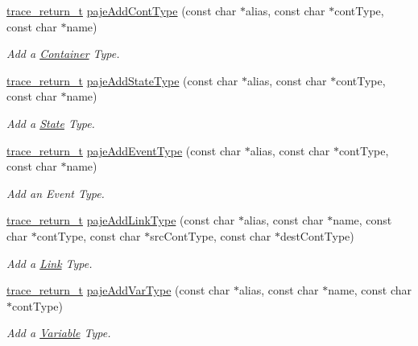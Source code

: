\begin{DoxyCompactItemize}
\hyperlink{group__type_ga1f1b68fb37d7331f03a48ef0993a0788}{trace\-\_\-return\-\_\-t} \hyperlink{group__cpaje_ga49ae68f2a567d8bbac4cb6f7b6726ae8}{paje\-Add\-Cont\-Type} (const char $\ast$alias, const char $\ast$cont\-Type, const char $\ast$name)
\begin{DoxyCompactList}\small\item\em Add a \hyperlink{structContainer}{Container} Type. \end{DoxyCompactList}\item 
\hyperlink{group__type_ga1f1b68fb37d7331f03a48ef0993a0788}{trace\-\_\-return\-\_\-t} \hyperlink{group__cpaje_gab77a5b730b5b0e58777d75e1c1bfbdaf}{paje\-Add\-State\-Type} (const char $\ast$alias, const char $\ast$cont\-Type, const char $\ast$name)
\begin{DoxyCompactList}\small\item\em Add a \hyperlink{structState}{State} Type. \end{DoxyCompactList}\item 
\hyperlink{group__type_ga1f1b68fb37d7331f03a48ef0993a0788}{trace\-\_\-return\-\_\-t} \hyperlink{group__cpaje_gaebcc766a17f5ffc055432687e946a1ea}{paje\-Add\-Event\-Type} (const char $\ast$alias, const char $\ast$cont\-Type, const char $\ast$name)
\begin{DoxyCompactList}\small\item\em Add an Event Type. \end{DoxyCompactList}\item 
\hyperlink{group__type_ga1f1b68fb37d7331f03a48ef0993a0788}{trace\-\_\-return\-\_\-t} \hyperlink{group__cpaje_ga4b8a30594207e3bd62ad22500a363555}{paje\-Add\-Link\-Type} (const char $\ast$alias, const char $\ast$name, const char $\ast$cont\-Type, const char $\ast$src\-Cont\-Type, const char $\ast$dest\-Cont\-Type)
\begin{DoxyCompactList}\small\item\em Add a \hyperlink{structLink}{Link} Type. \end{DoxyCompactList}\item 
\hyperlink{group__type_ga1f1b68fb37d7331f03a48ef0993a0788}{trace\-\_\-return\-\_\-t} \hyperlink{group__cpaje_ga0045c9aebf879d257d45ffca3a580dd2}{paje\-Add\-Var\-Type} (const char $\ast$alias, const char $\ast$name, const char $\ast$cont\-Type)
\begin{DoxyCompactList}\small\item\em Add a \hyperlink{structVariable}{Variable} Type. \end{DoxyCompactList}\item 

\end{DoxyCompactItemize}
